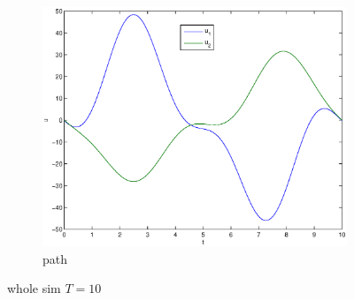 \begin{figure}
\begin{subfigure}[b]{\textwidth}
\centering
\includegraphics[height=0.3\textheight]{img/final_15_15_10_u.eps}
\caption{path}
\end{subfigure}
\caption{whole sim $T=10$}
\end{figure}

